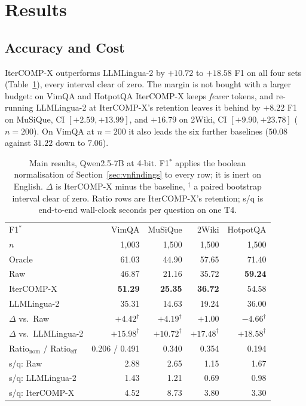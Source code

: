 \documentclass[runningheads]{llncs}
\begin{document}
\section{Results}
\label{sec:results}
\subsection{Accuracy and Cost}
IterCOMP-X outperforms LLMLingua-2 by $+10.72$ to $+18.58$ F1 on all four sets
(Table~\ref{tab:4ds}), every interval clear of zero. The margin is not bought with
a larger budget: on VimQA and HotpotQA IterCOMP-X keeps \emph{fewer} tokens, and
re-running LLMLingua-2 at IterCOMP-X's retention leaves it behind by $+8.22$ F1 on
MuSiQue, CI $[+2.59,+13.99]$, and $+16.79$ on 2Wiki, CI $[+9.90,+23.78]$
($n=200$). On VimQA at $n=200$ it also leads the six further baselines ($50.08$
against $31.22$ down to $7.06$).

\begin{table}[t]
\centering
\caption{Main results, Qwen2.5-7B at 4-bit. F1$^*$ applies the boolean
normalisation of Section~\ref{sec:vnfindings} to every row; it is inert on English.
$\Delta$ is IterCOMP-X minus the baseline, $^\dag$ a paired bootstrap interval
clear of zero. Ratio rows are IterCOMP-X's retention; s/q is end-to-end
wall-clock seconds per question on one T4.}
\label{tab:4ds}
\footnotesize
\setlength{\tabcolsep}{4pt}
\begin{tabular}{lrrrr}
\toprule
F1$^*$ & VimQA & MuSiQue & 2Wiki & HotpotQA \\
$n$ & 1{,}003 & 1{,}500 & 1{,}500 & 1{,}500 \\
\midrule
Oracle & 61.03 & 44.90 & 57.65 & 71.40 \\
Raw & 46.87 & 21.16 & 35.72 & \textbf{59.24} \\
IterCOMP-X & \textbf{51.29} & \textbf{25.35} & \textbf{36.72} & 54.58 \\
LLMLingua-2 & 35.31 & 14.63 & 19.24 & 36.00 \\
\midrule
$\Delta$ vs.\ Raw & $+4.42^\dag$ & $+4.19^\dag$ & $+1.00$ & $-4.66^\dag$ \\
$\Delta$ vs.\ LLMLingua-2 & $+15.98^\dag$ & $+10.72^\dag$ & $+17.48^\dag$ & $+18.58^\dag$ \\
\midrule
Ratio$_\text{nom}$ / Ratio$_\text{eff}$ & 0.206 / 0.491 & 0.340 & 0.354 & 0.194 \\
\midrule
s/q: Raw & 2.88 & 2.65 & 1.15 & 1.67 \\
s/q: LLMLingua-2 & 1.43 & 1.21 & 0.69 & 0.98 \\
s/q: IterCOMP-X & 4.52 & 8.73 & 3.80 & 3.30 \\
\bottomrule
\end{tabular}
\end{table}
\end{document}
